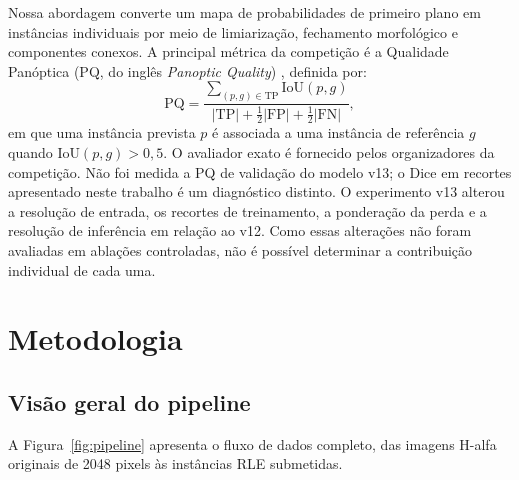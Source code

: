 \documentclass[
  article,
  11pt,
  oneside,
  a4paper,
  english,
  brazil,
  sumario=tradicional
]{abntex2}
\begin{document}
Nossa abordagem converte um mapa de probabilidades de primeiro plano em instâncias individuais por meio de limiarização, fechamento morfológico e componentes conexos. A principal métrica da competição é a Qualidade Panóptica (PQ, do inglês \textit{Panoptic Quality}) \cite{kirillov2019panoptic}, definida por:
\begin{equation}
\mathrm{PQ} =
\frac{\sum_{(p,g)\in\mathrm{TP}} \mathrm{IoU}(p,g)}
{|\mathrm{TP}| + \tfrac{1}{2}|\mathrm{FP}| + \tfrac{1}{2}|\mathrm{FN}|},
\end{equation}
em que uma instância prevista $p$ é associada a uma instância de referência $g$ quando $\mathrm{IoU}(p,g)>0{,}5$. O avaliador exato é fornecido pelos organizadores da competição. Não foi medida a PQ de validação do modelo v13; o Dice em recortes apresentado neste trabalho é um diagnóstico distinto. O experimento v13 alterou a resolução de entrada, os recortes de treinamento, a ponderação da perda e a resolução de inferência em relação ao v12. Como essas alterações não foram avaliadas em ablações controladas, não é possível determinar a contribuição individual de cada uma.

\section{Metodologia}

\subsection{Visão geral do pipeline}

A Figura~\ref{fig:pipeline} apresenta o fluxo de dados completo, das imagens H-alfa originais de 2048 pixels às instâncias RLE submetidas.
\end{document}
